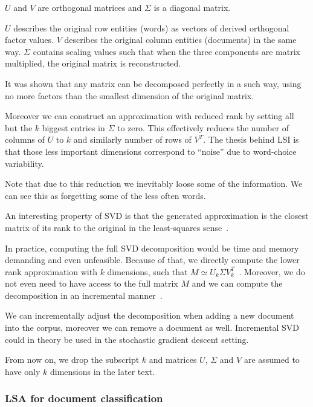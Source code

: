     $U$ and $V$ are orthogonal matrices and $\Sigma$ is a diagonal matrix.
    
    {}

    $U$ describes the original row entities (words) as vectors of derived orthogonal  factor values. 
    $V$ describes the original column entities (documents) in the same way.
    $\Sigma$ contains scaling values such that when the three components are matrix multiplied, the original matrix is reconstructed.

    It was shown that any matrix can be decomposed perfectly in a such way, using no more factors than the smallest dimension of the original matrix.
    
    Moreover we can construct an approximation with reduced rank by setting all but the $k$ biggest entries in $\Sigma$ to zero. 
    This effectively reduces the number of columns of $U$ to $k$ and similarly number of rows of $V^T$.
    The thesis behind LSI is that those less important dimensions correspond to “noise” due to word-choice variability.
    
    Note that due to this reduction we inevitably loose some of the information. 
    We can see this as forgetting some of the less often words.

    An interesting property of SVD is that the generated approximation is the closest matrix of its rank to the original in the least-squares sense~\cite{berry1995using}.

    In practice, computing the full SVD decomposition would be time and memory demanding and even unfeasible.
    Because of that, we directly compute the lower rank approximation with $k$ dimensions,
    such that $M \simeq U_k \Sigma V_k^T$~\cite{halko2011finding}. %
    Moreover, we do not even need to have access to the full matrix $M$ and we can compute the decomposition in an incremental manner~\cite{brand2006fast}. %
    
    We can incrementally adjust the decomposition when adding a new document into the corpus, moreover we can remove a document as well.
    Incremental SVD could in theory be used in the stochastic gradient descent setting.
    
    From now on, we drop the subscript $k$ and matrices $U$, $\Sigma$ and $V$ are assumed to have only $k$ dimensions  in the later text.
    
    
    \subsubsection{LSA for document classification}
    
